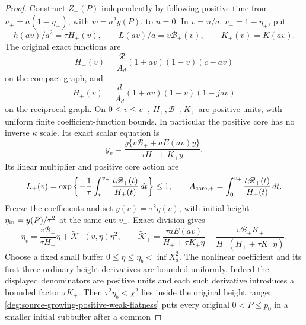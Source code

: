 \begin{proof}
Construct \(Z_+(P)\) independently by following positive time
from \(u_+=a(1-\eta_+)\), with \(w=a^2y(P)\), to \(u=0\).
In \(v=u/a\), \(v_+=1-\eta_+\), put
\begin{equation}
 h(av)/a^2=\tau H_+(v),\qquad
 L(av)/a=v\mathscr B_+(v),\qquad K_+(v)=K(av).
 \end{equation}
The original exact functions are
\begin{equation}
 H_+(v)=\frac{\mathcal R}{A_d}
        (1+av)(1-v)(c-av)
 \end{equation}
on the compact graph, and
\begin{equation}
 H_+(v)=\frac d{A_d}(1+av)(1-v)(1-jav)
 \end{equation}
on the reciprocal graph.  On \(0\le v\le v_+\),
\(H_+,\mathscr B_+,K_+\) are positive units, with uniform
finite coefficient-function bounds.  In particular the
positive core has no inverse \(\kappa\) scale.
Its exact scalar equation is
\begin{equation}
 y_v=\frac{y\{v\mathscr B_++aE(av)y\}}
                         {\tau H_++K_+y}.
 \label{deg:source-growing-positive-core-equation}
\end{equation}
Its linear multiplier and positive core action are
\begin{equation}
 L_+(v)=\exp\left\{-\frac1\tau
              \int_v^{v_+}\frac{t\mathscr B_+(t)}{H_+(t)}\,dt
                    \right\}\le1,\qquad
 A_{\rm core,+}=\int_0^{v_+}\frac{t\mathscr B_+(t)}{H_+(t)}\,dt.
 \label{deg:source-growing-positive-core-linear-factor}
\end{equation}
Freeze the coefficients and set \(y(v)=\tau^2\eta(v)\),
with initial height \(\eta_{\rm in}=y(P)/\tau^2\) at the same cut
\(v_+\). Exact division gives
\begin{equation}\label{deg:source-growing-positive-core-rescaled-equation}
 \eta_v=\frac{v\mathscr B_+}{\tau H_+}\eta
                         +\widetilde{\mathcal K}_+(v,\eta)\eta^2,
 \qquad
 \widetilde{\mathcal K}_+
 =\frac{\tau aE(av)}{H_++\tau K_+\eta}
 -\frac{v\mathscr B_+K_+}{H_+(H_++\tau K_+\eta)}.
\end{equation}
Choose a fixed small buffer \(0\le\eta\le\eta_b<\inf X_d^2\).
The nonlinear coefficient and its first three ordinary height
derivatives are bounded uniformly. Indeed the
displayed denominators are positive units and each such derivative
introduces a bounded factor \(\tau K_+\).
Then \(\tau^2\eta_b<\chi^2\) lies inside the original height range;
\eqref{deg:source-growing-positive-weak-flatness} puts every original
\(0<P\le p_0\) in a smaller initial subbuffer after a common

\end{proof}
